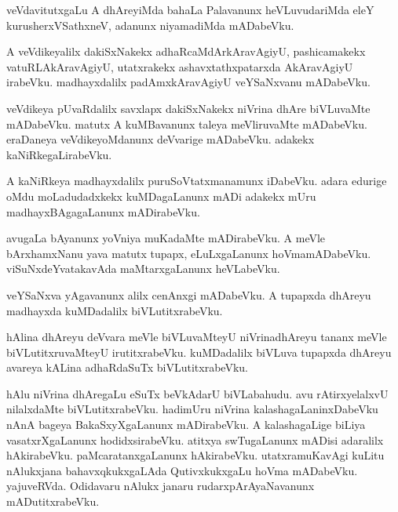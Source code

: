 \documentclass{article}
\begin{document}
\begin{mn}
veVdavitutxgaLu  A  dhAreyiMda  bahaLa  Palavanunx  heVLuvudariMda  eleY  kurusherxVSathxneV,  
adanunx  niyamadiMda  mADabeVku.
\end{mn}

\begin{mn}
A  veVdikeyalilx  dakiSxNakekx  adhaRcaMdArkAravAgiyU,  pashicamakekx  vatuRLAkAravAgiyU,  utatxrakekx  
ashavxtathxpatarxda  AkAravAgiyU  irabeVku.  madhayxdalilx  padAmxkAravAgiyU  veYSaNxvanu  mADabeVku.
\end{mn}

\begin{mn}
veVdikeya  pUvaRdalilx  savxlapx  dakiSxNakekx  niVrina  dhAre  biVLuvaMte  mADabeVku.  
matutx  A  kuMBavanunx  taleya  meVliruvaMte  mADabeVku.  eraDaneya  veVdikeyoMdanunx  
deVvarige  mADabeVku.  adakekx  kaNiRkegaLirabeVku.  
\end{mn}

\begin{mn}
A  kaNiRkeya  madhayxdalilx  puruSoVtatxmanamunx  iDabeVku.  adara  edurige  oMdu  moLadudadxkekx  
kuMDagaLanunx  mADi  adakekx  mUru  madhayxBAgagaLanunx  mADirabeVku.
\end{mn}

\begin{mn}
avugaLa  bAyanunx  yoVniya  muKadaMte  mADirabeVku.  A  meVle  bArxhamxNanu  yava  matutx  tupapx,  
eLuLxgaLanunx  hoVmamADabeVku.  viSuNxdeYvatakavAda  maMtarxgaLanunx  heVLabeVku.
\end{mn}

\begin{mn}
veYSaNxva  yAgavanunx  alilx  cenAnxgi  mADabeVku.  A  tupapxda  dhAreyu  madhayxda  kuMDadalilx  biVLutitxrabeVku.
\end{mn}

\begin{mn}
hAlina  dhAreyu  deVvara  meVle  biVLuvaMteyU  niVrinadhAreyu  tananx  meVle  biVLutitxruvaMteyU  
irutitxrabeVku.  kuMDadalilx  biVLuva  tupapxda  dhAreyu  avareya  kALina  adhaRdaSuTx  biVLutitxrabeVku.
\end{mn}

\begin{mn}
hAlu  niVrina  dhAregaLu  eSuTx  beVkAdarU  biVLabahudu.  avu  rAtirxyelalxvU  nilalxdaMte  
biVLutitxrabeVku.  hadimUru  niVrina  kalashagaLaninxDabeVku  nAnA bageya  BakaSxyXgaLanunx  
mADirabeVku.  A  kalashagaLige  biLiya  vasatxrXgaLanunx  hodidxsirabeVku.  atitxya swTugaLanunx  
mADisi  adaralilx  hAkirabeVku.  paMcaratanxgaLanunx  hAkirabeVku.  utatxramuKavAgi  kuLitu  
nAlukxjana  bahavxqkukxgaLAda  QutivxkukxgaLu  hoVma mADabeVku.  yajuveRVda.  Odidavaru  nAlukx  
janaru  rudarxpArAyaNavanunx  mADutitxrabeVku.
\end{mn}
\end{document}
